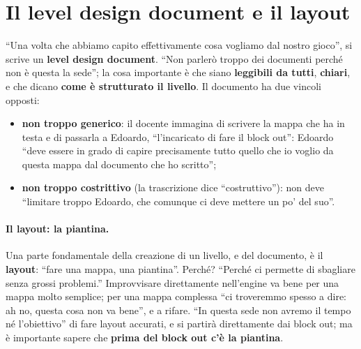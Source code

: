 \section{Il level design document e il layout}
\label{ue13:sec:layout}

``Una volta che abbiamo capito effettivamente cosa vogliamo dal nostro gioco'', si scrive un
\textbf{level design document}. ``Non parlerò troppo dei documenti perché non è questa la
sede''; la cosa importante è che siano \textbf{leggibili da tutti}, \textbf{chiari}, e che
dicano \textbf{come è strutturato il livello}. Il documento ha due vincoli opposti:
\begin{itemize}
  \item \textbf{non troppo generico}: il docente immagina di scrivere la mappa che ha in
        testa e di passarla a Edoardo, ``l'incaricato di fare il block out'': Edoardo
        ``deve essere in grado di capire precisamente tutto quello che io voglio da questa
        mappa dal documento che ho scritto'';
  \item \textbf{non troppo costrittivo} (la trascrizione dice ``costruttivo''): non deve
        ``limitare troppo Edoardo, che comunque ci deve mettere un po' del suo''.
\end{itemize}

\paragraph{Il layout: la piantina.} Una parte fondamentale della creazione di un livello,
e del documento, è il \textbf{layout}: ``fare una mappa, una piantina''. Perché? ``Perché
ci permette di sbagliare senza grossi problemi.'' Improvvisare direttamente nell'engine va
bene per una mappa molto semplice; per una mappa complessa ``ci troveremmo spesso a dire:
ah no, questa cosa non va bene'', e a rifare. ``In questa sede non avremo il tempo né
l'obiettivo'' di fare layout accurati, e si partirà direttamente dai block out; ma è
importante sapere che \textbf{prima del block out c'è la piantina}.

